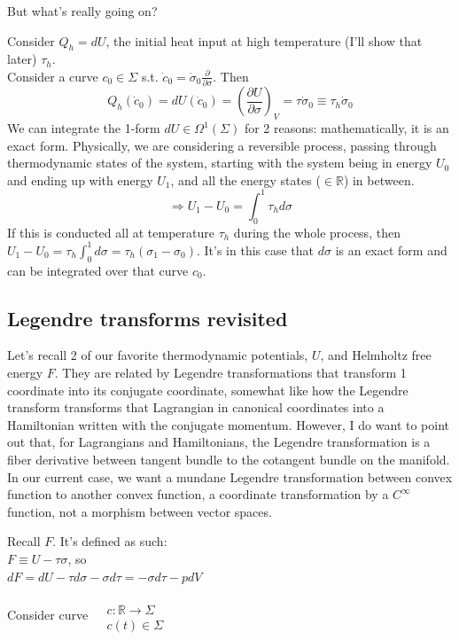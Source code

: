 \documentclass[twoside]{amsart}
\theoremstyle{plain}
\theoremstyle{definition}
\begin{document}
But what's really going on? 

Consider $Q_h = dU$, the initial heat input at high temperature (I'll show that later) $\tau_h$.  \\
Consider a curve $c_0 \in \Sigma$ s.t. $\dot{c}_0 = \dot{\sigma}_0 \frac{ \partial }{ \partial \sigma}$.  Then
\[
Q_h(\dot{c}_0) = dU(\dot{c}_0 ) = \left( \frac{ \partial U}{ \partial \sigma} \right)_V = \tau \dot{\sigma}_0 \equiv \tau_h \dot{\sigma}_0
\]
We can integrate the 1-form $dU \in \Omega^1(\Sigma)$ for 2 reasons: mathematically, it is an exact form.  Physically, we are considering a reversible process, passing through thermodynamic states of the system, starting with the system being in energy $U_0$ and ending up with energy $U_1$, and all the energy states ($\in \mathbb{R}$) in between.  
\[
\Longrightarrow U_1 - U_0 = \int_0^1 \tau_h d\sigma
\]
If this is conducted all at temperature $\tau_h$ during the whole process, then $U_1 - U_0 = \tau_h \int_0^1 d\sigma = \tau_h ( \sigma_1 - \sigma_0)$.  It's in this case that $d\sigma$ is an exact form and can be integrated over that curve $c_0$.  

\subsection*{Legendre transforms revisited}

Let's recall 2 of our favorite thermodynamic potentials, $U$, and Helmholtz free energy $F$.  They are related by Legendre transformations that transform 1 coordinate into its conjugate coordinate, somewhat like how the Legendre transform transforms that Lagrangian in canonical coordinates into a Hamiltonian written with the conjugate momentum.  However, I do want to point out that, for Lagrangians and Hamiltonians, the Legendre transformation is a fiber derivative between tangent bundle to the cotangent bundle on the manifold.  In our current case, we want a mundane Legendre transformation between convex function to another convex function, a coordinate transformation by a $C^{\infty}$ function, not a morphism between vector spaces.  

Recall $F$. It's defined as such: \\
$F\equiv U -\tau \sigma$, so \\
$dF = dU- \tau d\sigma - \sigma d\tau = -\sigma d\tau - pdV$

Consider curve $\begin{aligned} & \quad \\
  & c : \mathbb{R} \to \Sigma \\
  & c(t) \in \Sigma \end{aligned}$
\end{document}
